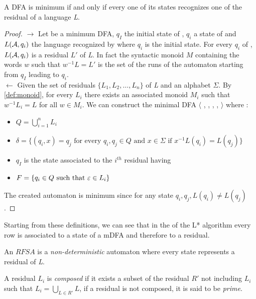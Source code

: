 \begin{theorem}
  A DFA is minimum if and only if every one of its states recognizes one of the residual of a language \textit{L}.
\end{theorem}

\begin{proof}
  $\rightarrow$ Let \automaton{} be a minimum DFA, $q_I$ the initial state of \automaton{}, $q_i$ a state of \automaton{} and $L(\mathcal{A}{}, q_i)$ the language recognized by \automaton{} where $q_i$ is the initial state. For every $q_i$ of \automaton{}, $L(\mathcal{A}{}, q_i)$ is a residual $L'$ of \textit{L}. In fact the syntactic monoid $M$ containing the words $w$ such that $w^{-1}L = L'$ is the set of the runs of the automaton starting from $q_I$ leading to $q_i$. \\
  $\leftarrow$ Given the set of residuals $\{L_1, L_2, \dots, L_n\}$ of \textit{L} and an alphabet $\Sigma$. By \cref{def:monoid}, for every $L_i$ there exists an associated monoid $M_i$ such that $w^{-1}L_i = L$ for all $w \in M_i$. We can construct the minimal DFA $\langle$ \alphabet{}, \states{}, \transition{}, \qzero{}, \qend{} $\rangle$ where :
  \begin{itemize}
    \item $Q = \bigcup_{i=1}^{n}L_i$
    \item $\delta = \{(q_i, x) = q_j \text{ for every } q_i, q_j \in Q \text{ and } x \in \Sigma \text{ if } x^{-1}L(q_i) = L(q_j)\}$
    \item $q_I$ is the state associated to the $i^{th}$ residual having
    \item $F = \{q_i \in Q \text{ such that } \varepsilon \in L_i\}$
  \end{itemize}
  The created automaton is minimum since for any state $q_i, q_j, L(q_i) \neq L(q_j)$.
\end{proof}

Starting from these definitions, we can see that in the \OT of the L* algorithm every row is associated to a state of a mDFA and therefore to a residual.

\begin{definition}
  An $RFSA$ is a \textit{non-deterministic} automaton where every state represents a residual of \textit{L}.
\end{definition}

\begin{definition}
  A residual $L_i$ is \textit{composed} if it exists a subset of the residual $R'$ not including $L_i$ such that $L_i = \bigcup_{L \in R'}L$, if a residual is not composed, it is said to be \textit{prime}.
\end{definition}

